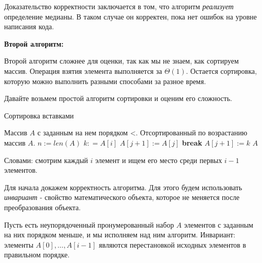 \documentclass[../book.tex]{subfiles}
\begin{document}
	Доказательство корректности заключается в том, что алгоритм \textit{реализует} определение медианы. В таком случае он корректен, пока нет ошибок на уровне написания кода.
	
	\textbf{Второй алгоритм:}
	
	Второй алгоритм сложнее для оценки, так как мы не знаем, как сортируем массив. Операция взятия элемента выполняется за $\Theta(1)$. Остается сортировка, которую можно выполнить разными способами за разное время. 
	
	Давайте возьмем простой алгоритм сортировки и оценим его сложность.
	
	\begin{algorithm}
		\caption{Сортировка вставками}
		\begin{algorithmic}[1]
			\Require Массив $A$ с заданным на нем порядком <.
			\Ensure Отсортированный по возрастанию массив $A$.
				\State $n:=len(A)$
					\State $k: = A[i]$
							\State $A[j+1] := A[j]$
						\Else
							\State \textbf{break}
						\EndIf
					\EndFor
					\State $A[j + 1] := k$
				\EndFor
				\State \Return $A$
			\EndFunction
		\end{algorithmic}
	\end{algorithm}
	
	Словами: смотрим каждый $i$ элемент и ищем его место среди первых $i-1$ элементов.
	
	Для начала докажем корректность алгоритма. Для этого будем использовать \textit{инвариант} - свойство математического объекта, которое не меняется после преобразования объекта. 
	\begin{theorem}
		Пусть есть неупорядоченный пронумерованный набор $A$ элементов с заданным на них порядком меньше, и мы исполняем над ним алгоритм. Инвариант: элементы $A[0], \ldots, A[i - 1]$ являются перестановкой исходных элементов в правильном порядке.
	\end{theorem}
	
\end{document}
